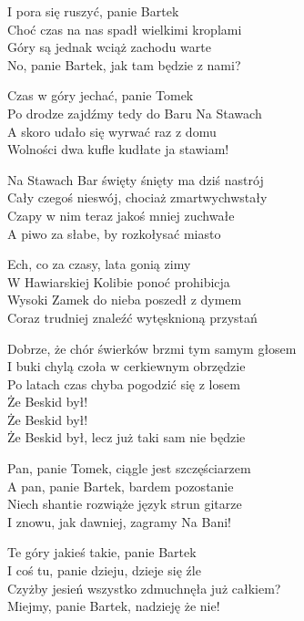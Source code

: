 \begin{text}
    I pora się ruszyć, panie Bartek\\
    Choć czas na nas spadł wielkimi kroplami\\
    Góry są jednak wciąż zachodu warte\\
    No, panie Bartek, jak tam będzie z nami?

    Czas w góry jechać, panie Tomek\\
    Po drodze zajdźmy tedy do Baru Na Stawach\\
    A skoro udało się wyrwać raz z domu\\
    Wolności dwa kufle kudłate ja stawiam!

    Na Stawach Bar święty śnięty ma dziś nastrój\\
    Cały czegoś nieswój, chociaż zmartwychwstały\\
    Czapy w nim teraz jakoś mniej zuchwałe\\
    A piwo za słabe, by rozkołysać miasto

    Ech, co za czasy, lata gonią zimy\\
    W Hawiarskiej Kolibie ponoć prohibicja\\
    Wysoki Zamek do nieba poszedł z dymem\\
    Coraz trudniej znaleźć wytęsknioną przystań

    Dobrze, że chór świerków brzmi tym samym głosem\\
    I buki chylą czoła w cerkiewnym obrzędzie\\
    Po latach czas chyba pogodzić się z losem\\
    Że Beskid był!\\
    Że Beskid był!\\
    Że Beskid był, lecz już taki sam nie będzie

    Pan, panie Tomek, ciągle jest szczęściarzem\\
    A pan, panie Bartek, bardem pozostanie\\
    Niech shantie rozwiąże język strun gitarze\\
    I znowu, jak dawniej, zagramy Na Bani!

    Te góry jakieś takie, panie Bartek\\
    I coś tu, panie dzieju, dzieje się źle\\
    Czyżby jesień wszystko zdmuchnęła już całkiem?\\
    Miejmy, panie Bartek, nadzieję że nie!


\end{text}
